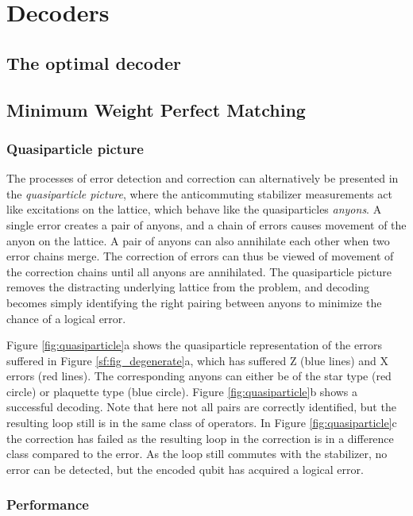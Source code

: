 \chapter{Decoders}\label{sec:surface_decoders}
\section{The optimal decoder}\label{sec:optimal_decoder}
\section{Minimum Weight Perfect Matching}\label{sec:MWPMdecoder}


\subsection{Quasiparticle picture}
The processes of error detection and correction can alternatively be presented in the \emph{quasiparticle picture}, where the anticommuting stabilizer measurements act like excitations on the lattice, which behave like the quasiparticles \emph{anyons}. A single error creates a pair of anyons, and a chain of errors causes movement of the anyon on the lattice. A pair of anyons can also annihilate each other when two error chains merge. The correction of errors can thus be viewed of movement of the correction chains until all anyons are annihilated. The quasiparticle picture removes the distracting underlying lattice from the problem, and decoding becomes simply identifying the right pairing between anyons to minimize the chance of a logical error.

Figure \ref{fig:quasiparticle}a shows the quasiparticle representation of the errors suffered in Figure \ref{sf:fig_degenerate}a, which has suffered Z (blue lines) and X errors (red lines). The corresponding anyons can either be of the star type (red circle) or plaquette type (blue circle). Figure \ref{fig:quasiparticle}b shows a successful decoding. Note that here not all pairs are correctly identified, but the resulting loop still is in the same class of operators. In Figure \ref{fig:quasiparticle}c the correction has failed as the resulting loop in the correction is in a difference class compared to the error. As the loop still commutes with the stabilizer, no error can be detected, but the encoded qubit has acquired a logical error.

\subsection{Performance}

